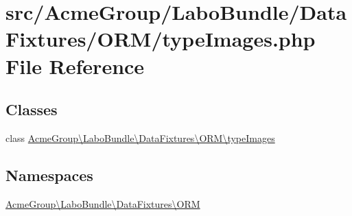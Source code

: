 \hypertarget{type_images_8php}{\section{src/\+Acme\+Group/\+Labo\+Bundle/\+Data\+Fixtures/\+O\+R\+M/type\+Images.php File Reference}
\label{type_images_8php}
}
\subsection*{Classes}
\begin{DoxyCompactItemize}
\item 
class \hyperlink{class_acme_group_1_1_labo_bundle_1_1_data_fixtures_1_1_o_r_m_1_1type_images}{Acme\+Group\textbackslash{}\+Labo\+Bundle\textbackslash{}\+Data\+Fixtures\textbackslash{}\+O\+R\+M\textbackslash{}type\+Images}
\end{DoxyCompactItemize}
\subsection*{Namespaces}
\begin{DoxyCompactItemize}
\item 
 \hyperlink{namespace_acme_group_1_1_labo_bundle_1_1_data_fixtures_1_1_o_r_m}{Acme\+Group\textbackslash{}\+Labo\+Bundle\textbackslash{}\+Data\+Fixtures\textbackslash{}\+O\+R\+M}
\end{DoxyCompactItemize}

